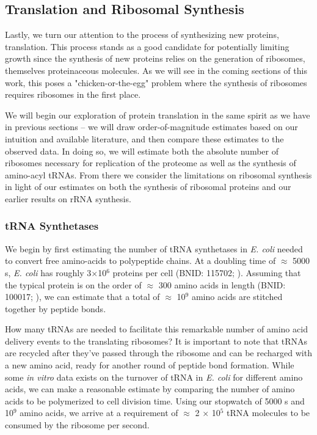 \subsection{Translation and Ribosomal Synthesis}
Lastly, we turn our attention to the process of synthesizing new proteins,
translation. This process stands as a good candidate for potentially limiting
growth since the synthesis of new proteins relies on the generation of
ribosomes, themselves proteinaceous molecules. As we will see in the coming
sections of this work, this poses a "chicken-or-the-egg" problem where the
synthesis of ribosomes requires ribosomes in the first place.

We will begin our exploration of protein translation in the same spirit as we
have in previous sections -- we will draw order-of-magnitude estimates based
on our intuition and available literature, and then compare these estimates
to the observed data. In doing so, we will estimate both the absolute number
of ribosomes necessary for replication of the proteome as well as the
synthesis of amino-acyl tRNAs. From there we consider the limitations on
ribosomal synthesis in light of our estimates on both the synthesis of
ribosomal proteins and our earlier results on rRNA synthesis.

\subsubsection{tRNA Synthetases}
We begin by first estimating the number of tRNA synthetases in \textit{E. coli}
needed to convert free amino-acids to polypeptide chains. At a doubling time
of $\approx$ 5000 s, \textit{E. coli} has roughly 3$\times$10$^6$ proteins
per cell (BNID: 115702; \cite{milo2010}). Assuming that the typical protein is
on the order of $\approx$ 300 amino acids in length (BNID: 100017;
\cite{milo2010}), we can estimate that a total of $\approx$ 10$^9$ amino acids
are stitched together by peptide bonds.

How many tRNAs are needed to facilitate this remarkable number of amino acid
delivery events to the translating ribosomes? It is important to note that tRNAs
are recycled after they've passed through the ribosome and can be recharged with
a new amino acid, ready for another round of peptide bond formation. While some
\textit{in vitro} data exists on  the turnover of tRNA in \textit{E. coli} for
different  amino acids, we can make a reasonable estimate by comparing the
number of amino acids to be  polymerized to cell division time. Using our
stopwatch of 5000 s and 10$^9$ amino acids, we arrive at a requirement of
$\approx$ 2 $\times$ 10$^5$ tRNA molecules to be consumed by the ribosome per
second.

